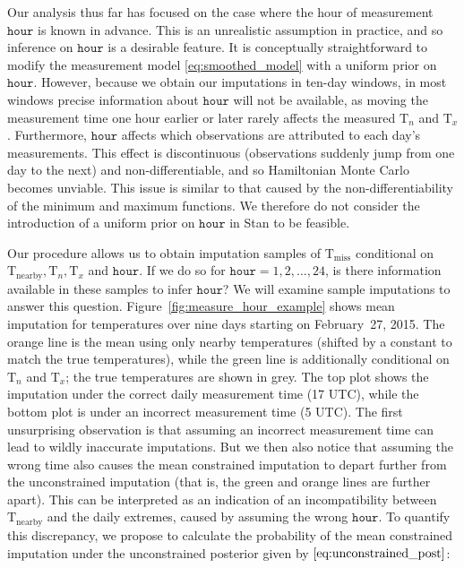 \documentclass[letter]{article}
\newcommand{\T}{\mathrm{T}}
\newcommand{\Tn}{\T_{n}}
\newcommand{\Tx}{\T_{x}}
\newcommand{\miss}{\mathrm{miss}}
\newcommand{\obs}{\mathrm{nearby}}
\newcommand{\hour}{\mathtt{hour}}
\begin{document}
Our analysis thus far has focused on the case where the hour of measurement \(\hour\) is known in advance.
This is an unrealistic assumption in practice, and so inference on \(\hour\) is a desirable feature.
It is conceptually straightforward to modify the measurement model \eqref{eq:smoothed_model} with a uniform prior on \(\hour\).
However, because we obtain our imputations in ten-day windows, in most windows precise information about \(\hour\) will not be available, as moving the measurement time one hour earlier or later rarely affects the measured \(\Tn\) and \(\Tx\).
Furthermore, \(\hour\) affects which observations are attributed to each day's measurements.
This effect is discontinuous (observations suddenly jump from one day to the next) and non-differentiable, and so Hamiltonian Monte Carlo becomes unviable.
This issue is similar to that caused by the non-differentiability of the minimum and maximum functions.
We therefore do not consider the introduction of a uniform prior on \(\hour\) in Stan to be feasible.
    


        Our procedure allows us to obtain imputation samples of \(\T_\miss\) conditional on \(\T_\obs,\Tn,\Tx\) and \(\hour\).
If we do so for \(\hour=1,2,\ldots,24\), is there information available in these samples to infer \(\hour\)?
We will examine sample imputations to answer this question.
Figure~\ref{fig:measure_hour_example} shows mean imputation for temperatures over nine days starting on February~27, 2015. The orange line is the mean using only nearby temperatures (shifted by a constant to match the true temperatures), while the green line is additionally conditional on \(\Tn\) and \(\Tx\); the true temperatures are shown in grey.
The top plot shows the imputation under the correct daily measurement time (17 UTC), while the bottom plot is under an incorrect measurement time (5 UTC).
The first unsurprising observation is that assuming an incorrect measurement time can lead to wildly inaccurate imputations.
But we then also notice that assuming the wrong time also causes the mean constrained imputation to depart further from the unconstrained imputation
(that is, the green and orange lines are further apart).
This can be interpreted as an indication of an incompatibility between \(\T_\obs\) and the daily extremes, caused by assuming the wrong \(\hour\).
To quantify this discrepancy, we propose to calculate the probability of the mean constrained imputation under the unconstrained posterior given by \(\eqref{eq:unconstrained_post}\):
\end{document}
